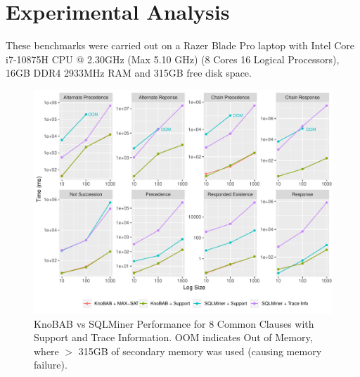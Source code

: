 



\section{Experimental Analysis}\label{sec:exp}
These benchmarks were carried out on a Razer Blade Pro laptop with Intel Core i7-10875H CPU @ 2.30GHz (Max 5.10 GHz) (8 Cores 16 Logical Processors), 16GB DDR4 2933MHz RAM and 315GB free disk space.
\begin{figure}[!t]
	\centering
	\includegraphics[width=.8\textwidth]{images/sqlminer_benchmark.pdf}
	\caption{KnoBAB vs SQLMiner Performance for 8 Common Clauses with Support and Trace Information. OOM indicates Out of Memory, where $>$ 315GB of secondary memory was used (causing memory failure).}\label{fig:vsSQL}
\end{figure}

